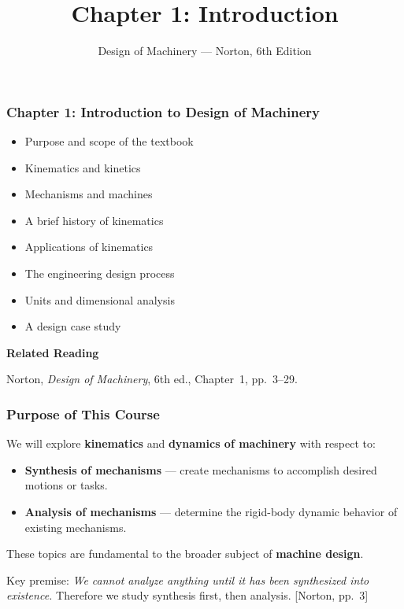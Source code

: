 \documentclass[10pt,aspectratio=43]{beamer}
\title{Chapter 1: Introduction}
\subtitle{Design of Machinery --- Norton, 6th Edition}
\author{}
\date{}
\newcommand{\pref}[1]{\vfill\hfill{\scriptsize\color{gray}[Norton, pp.~#1]}}
\begin{document}

\begin{frame}
\frametitle{Chapter 1: Introduction to Design of Machinery}

\begin{itemize}
  \item Purpose and scope of the textbook
  \item Kinematics and kinetics
  \item Mechanisms and machines
  \item A brief history of kinematics
  \item Applications of kinematics
  \item The engineering design process
  \item Units and dimensional analysis
  \item A design case study
\end{itemize}

\vspace{6pt}
\textbf{Related Reading}

Norton, \textit{Design of Machinery}, 6th ed., Chapter~1, pp.~3--29.
\end{frame}


\begin{frame}
\frametitle{Purpose of This Course}

We will explore \textbf{kinematics} and \textbf{dynamics of machinery} with respect to:

\begin{yellowbox}
\begin{itemize}
  \item \textbf{Synthesis of mechanisms} --- create mechanisms to accomplish desired motions or tasks.
  \item \textbf{Analysis of mechanisms} --- determine the rigid-body dynamic behavior of existing mechanisms.
\end{itemize}
\end{yellowbox}

\vspace{6pt}
These topics are fundamental to the broader subject of \textbf{machine design}.

\vspace{6pt}
Key premise: \emph{We cannot analyze anything until it has been synthesized into existence.} Therefore we study synthesis first, then analysis.
\pref{3}
\end{frame}
\end{document}
